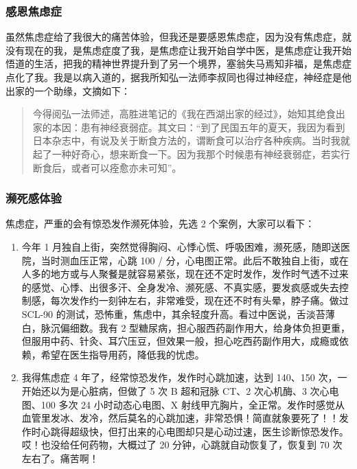 \documentclass[fontset=founder]{ctexart}
\begin{document}
\subsubsection{感恩焦虑症}

虽然焦虑症给了我很大的痛苦体验，但我还是要感恩焦虑症，因为没有焦虑症，就没有现在的我，是焦虑症度了我，是焦虑症让我开始自学中医，是焦虑症让我开始悟道的生活，把我的精神世界提升到了另一个境界，塞翁失马焉知非福，是焦虑症点化了我。我是以病入道的，据我所知弘一法师李叔同也得过神经症，神经症是他出家的一个助缘，文摘如下：

\begin{quote}
    今得阅弘一法师述，高胜进笔记的《我在西湖出家的经过》，始知其绝食出家的本因：患有神经衰弱症。其文曰：“到了民国五年的夏天，我因为看到日本杂志中，有说及关于断食方法的，谓断食可以治疗各种疾病。当时我就起了一种好奇心，想来断食一下。因为我那个时候患有神经衰弱症，若实行断食后，或者可以痊愈亦未可知”。
\end{quote}

\subsubsection{濒死感体验}

焦虑症，严重的会有惊恐发作濒死体验，先选 2 个案例，大家可以看下：

\begin{enumerate}
    \item 今年 1 月独自上街，突然觉得胸闷、心悸心慌、呼吸困难，濒死感，随即送医院，当时测血压正常，心跳 100 / 分，心电图正常。此后不敢独自上街，或在人多的地方或与人聚餐是就容易紧张，现在还不定时发作，发作时气透不过来的感觉、心悸、出很多汗、全身发冷、濒死感、不真实感，要发疯感或失去控制感，每次发作约一刻钟左右，非常难受，现在还不时有头晕，脖子痛。做过 SCL-90 的测试，恐怖重，焦虑中，其余轻度升高。看过中医说，舌淡苔薄白，脉沉偏细数。我有 2 型糖尿病，担心服西药副作用大，给身体负担更重，但服用中药、针灸、耳穴压豆，但效果一般，担心吃西药副作用大，成瘾或依赖，希望在医生指导用药，降低我的忧虑。
    \item 我得焦虑症 4 年了，经常惊恐发作，发作时心跳加速，达到 140、150 次，一开始还以为是心脏病，但做了 5 次 B 超和冠脉 CT、2 次心机酶、3 次心电图、100 多次 24 小时动态心电图、X 射线甲亢胸片，全正常。发作时感觉从血管里发冰、发冷，然后莫名的心跳加速，非常恐惧！简直就象要死了！！发作时心跳得超级快，但打出来的心电图却只是心动过速，医生诊断惊恐发作。哎！也没给任何药物，大概过了 20 分钟，心跳就自动恢复了，恢复到 70 次左右了。痛苦啊！
\end{enumerate}
\end{document}
